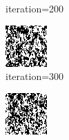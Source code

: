 \documentclass{article}
\begin{document}
\begin{figure}[h]
\begin{subfigure}[t]{0.18\textwidth}
\vspace{-0.6cm}
\caption{iteration=200}
\end{subfigure}\hspace{0.01\textwidth}
\begin{subfigure}[t]{0.18\textwidth}
\centering
\includegraphics[width=\textwidth]{./computational/results/gibbs_comb_sampler_positive_iter_300.png}
\vspace{-0.6cm}
\caption{iteration=300}
\end{subfigure}\hspace{0.01\textwidth}
\begin{subfigure}[t]{0.18\textwidth}
\centering
\includegraphics[width=\textwidth]{./computational/results/gibbs_comb_sampler_positive_iter_400.png}

\end{subfigure}
\end{figure}
\end{document}
